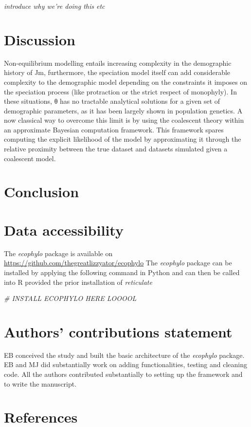 \documentclass[
]{article}
\newenvironment{Shaded}{\begin{snugshade}}{\end{snugshade}}
\newcommand{\CommentTok}[1]{\textcolor[rgb]{0.56,0.35,0.01}{\textit{#1}}}
\begin{document}
\emph{introduce why we're doing this etc}

\hypertarget{discussion}{%
\section{Discussion}\label{discussion}}

Non-equilibrium modelling entails increasing complexity in the
demographic history of Jm, furthermore, the speciation model itself can
add considerable complexity to the demographic model depending on the
constraints it imposes on the speciation process (like protraction or
the strict respect of monophyly). In these situations, θ has no
tractable analytical solutions for a given set of demographic
parameters, as it has been largely shown in population genetics. A now
classical way to overcome this limit is by using the coalescent theory
within an approximate Bayesian computation framework. This framework
spares computing the explicit likelihood of the model by approximating
it through the relative proximity between the true dataset and datasets
simulated given a coalescent model.

\hypertarget{conclusion}{%
\section{Conclusion}\label{conclusion}}

\hypertarget{data-accessibility}{%
\section{Data accessibility}\label{data-accessibility}}

The \emph{ecophylo} package is available on
\url{https://github.com/thegreatlizzyator/ecophylo} The \emph{ecophylo}
package can be installed by applying the following command in Python and
can then be called into R provided the prior installation of
\emph{reticulate}

\begin{Shaded}
\begin{Highlighting}[]
\CommentTok{\# INSTALL ECOPHYLO HERE LOOOOL}
\end{Highlighting}
\end{Shaded}

\hypertarget{authors-contributions-statement}{%
\section{Authors' contributions
statement}\label{authors-contributions-statement}}

EB conceived the study and built the basic architecture of the
\emph{ecophylo} package. EB and MJ did substantially work on adding
functionalities, testing and cleaning code. All the authors contributed
substantially to setting up the framework and to write the manuscript.

\hypertarget{references}{%
\section{References}\label{references}}
\end{document}

